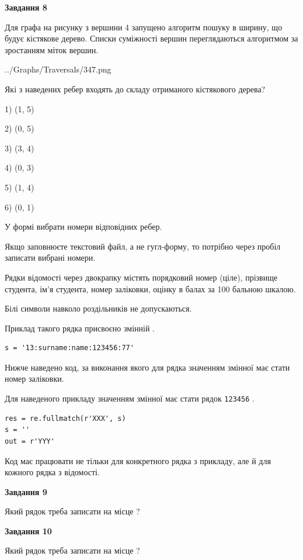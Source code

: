 \documentclass[12pt, ukrainian]{article}
\def\code#1{\Verb!#1!}
\begin{document}
{\begin {large}
{\begin {center}\textbf{Завдання 8}\end {center}}\par
Для графа на рисунку з вершини 4 запущено алгоритм пошуку в ширину, що будує кістякове дерево. Списки суміжності вершин переглядаються алгоритмом за зростанням міток вершин.\par
\begin{center}
	{../Graphs/Traversals/347.png}
\end{center}
\par Які з наведених ребер входять до складу отриманого кістякового дерева?\par
1) (1, 5)\par
2) (0, 5)\par
3) (3, 4)\par
4) (0, 3)\par
5) (1, 4)\par
6) (0, 1)\par
{\vskip 15pt} У формі вибрати номери відповідних ребер.


Якщо заповнюєте текстовий файл, а не гугл-форму, то потрібно через пробіл записа\-ти вибрані номери.\par
\newpage


Рядки відомості через двокрапку містять порядковий номер (ціле), пріз\-ви\-ще студен\-та, ім'я студента, номер заліковки, оцінку в балах за 100 бальною шкалою.

Білі символи навколо роздільників не допускаються.

Приклад такого рядка присвоєно змінній .



\begin{verbatim}
s = '13:surname:name:123456:77'
\end{verbatim}


Нижче наведено код, за виконання якого для рядка  значенням змінної  має стати номер заліковки.

Для наведеного прикладу значенням змінної  має стати рядок \code{123456} .



\begin{verbatim}
res = re.fullmatch(r'XXX', s)
s = ''
out = r'YYY'
\end{verbatim}


Код має працювати не тільки для конкретного рядка з прикладу, але й для кожного рядка з відомості.

{\begin {center}\textbf{Завдання 9}\end {center}}\par
Який рядок треба записати на місце  ?\par
\vspace{5mm}


{\begin {center}\textbf{Завдання 10}\end {center}}\par
Який рядок треба записати на місце  ?\par


\newpage


\end {large}}
\end{document}
